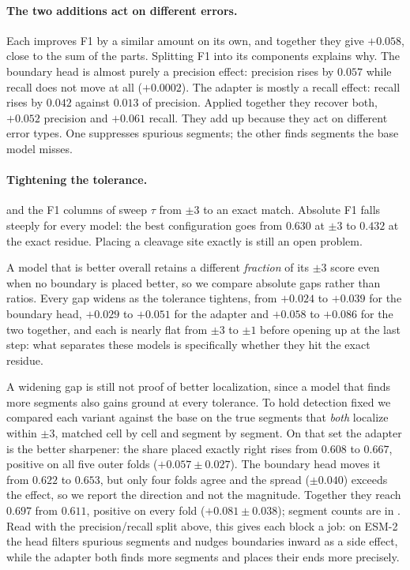 \documentclass{article}
\begin{document}
\paragraph{The two additions act on different errors.} Each improves F1 by a similar amount on its own, and together they give $+0.058$, close to the sum of the parts. Splitting F1 into its components explains why. The boundary head is almost purely a precision effect: precision rises by $0.057$ while recall does not move at all ($+0.0002$). The adapter is mostly a recall effect: recall rises by $0.042$ against $0.013$ of precision. Applied together they recover both, $+0.052$ precision and $+0.061$ recall. They add up because they act on different error types. One suppresses spurious segments; the other finds segments the base model misses.

\paragraph{Tightening the tolerance.}  and the F1 columns of  sweep $\tau$ from $\pm3$ to an exact match. Absolute F1 falls steeply for every model: the best configuration goes from $0.630$ at $\pm3$ to $0.432$ at the exact residue. Placing a cleavage site exactly is still an open problem.

A model that is better overall retains a different \emph{fraction} of its $\pm3$ score even when no boundary is placed better, so we compare absolute gaps rather than ratios. Every gap widens as the tolerance tightens, from $+0.024$ to $+0.039$ for the boundary head, $+0.029$ to $+0.051$ for the adapter and $+0.058$ to $+0.086$ for the two together, and each is nearly flat from $\pm3$ to $\pm1$ before opening up at the last step: what separates these models is specifically whether they hit the exact residue.

A widening gap is still not proof of better localization, since a model that finds more segments also gains ground at every tolerance. To hold detection fixed we compared each variant against the base on the true segments that \emph{both} localize within $\pm3$, matched cell by cell and segment by segment. On that set the adapter is the better sharpener: the share placed exactly right rises from $0.608$ to $0.667$, positive on all five outer folds ($+0.057\pm0.027$). The boundary head moves it from $0.622$ to $0.653$, but only four folds agree and the spread ($\pm0.040$) exceeds the effect, so we report the direction and not the magnitude. Together they reach $0.697$ from $0.611$, positive on every fold ($+0.081\pm0.038$); segment counts are in . Read with the precision/recall split above, this gives each block a job: on ESM-2 the head filters spurious segments and nudges boundaries inward as a side effect, while the adapter both finds more segments and places their ends more precisely.
\end{document}
